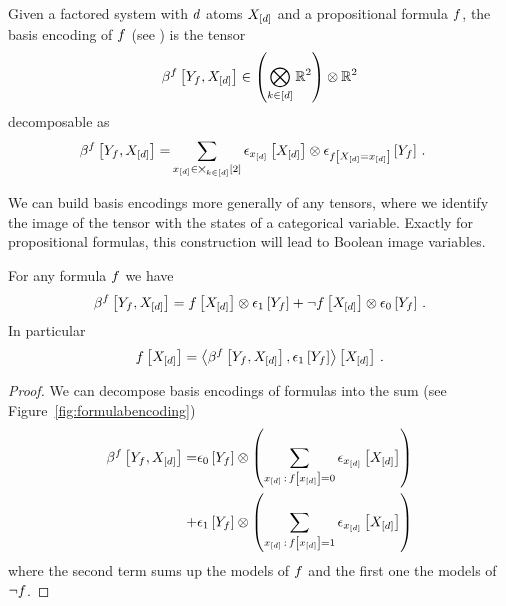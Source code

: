 Given a factored system with $d$ atoms $X_{[d]}$ and a propositional formula $f$, the basis encoding of $f$ (see ) is the tensor
\begin{align*}
	\beta^{f}\left[Y_{f},X_{[d]}\right] \in  \left(\bigotimes_{k\in[d]}\mathbb{R}^2 \right) \otimes \mathbb{R}^2
\end{align*}
decomposable as
\begin{align} 
	\beta^{f}\left[Y_{f},X_{[d]}\right]
	= & \sum_{x_{[d]}\in\bigtimes_{k\in[d]}[2]}  \epsilon_{x_{[d]}}\left[X_{[d]}\right] \otimes \epsilon_{f\left[X_{[d]}=x_{[d]}\right]}\left[Y_{f}\right] \, . 
\end{align}

We can build basis encodings more generally of any tensors, where we identify the image of the tensor with the states of a categorical variable.
Exactly for propositional formulas, this construction will lead to Boolean image variables.


\begin{lemma}\label{lem:formulaEncodingDecomposition}
	For any formula $f$ we have
	\begin{align*}
		\beta^{f}\left[Y_{f},X_{[d]}\right]
		= f\left[X_{[d]}\right] \otimes \epsilon_1\left[Y_{f}\right]
		+ \lnot f\left[X_{[d]}\right] \otimes  \epsilon_0\left[Y_{f}\right] \, .
	\end{align*}
	In particular
	\begin{align*}
		 f\left[X_{[d]}\right] = \left\langle 
		\beta^{f}\left[Y_{f},X_{[d]}\right],\epsilon_1\left[Y_{f}\right]
		\right\rangle \left[ X_{[d]} \right] \, .
	\end{align*}
\end{lemma}
\begin{proof}
	We can decompose basis encodings of formulas into the sum (see Figure~\ref{fig:formulabencoding}) %
	\begin{align} 
		 \beta^{f}\left[Y_{f},X_{[d]}\right]
		 = & \epsilon_0\left[Y_{f}\right] \otimes \left( \sum_{x_{[d]}\,:\,f\left[x_{[d]}\right]=0}  \epsilon_{x_{[d]}}\left[X_{[d]}\right] \right) \\
		 + & \epsilon_1\left[Y_{f}\right] \otimes \left( \sum_{x_{[d]}\,:\,f\left[x_{[d]}\right]=1}  \epsilon_{x_{[d]}}\left[X_{[d]}\right] \right)
	\end{align}
	where the second term sums up the models of $f$ and the first one the models of $\lnot f$.
\end{proof}


